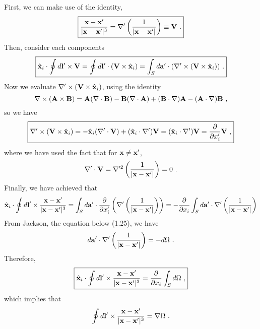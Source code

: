 \documentclass[12pt]{article}
\newcommand{\x}{{\bf x}}
\newcommand{\bl}{{\bf l}}
\begin{document}
First, we can make use of the identity,
\begin{equation}
    \boxed{
    \frac{\x - \x'}{|\x - \x'|^3} = \nabla' \left(\frac{1}{|\x - \x'|}\right) \equiv {\bf V}~.
    }
\end{equation}
Then, consider each components
\begin{align}
    \boxed{
    \hat{\x}_i \cdot \oint d\bl' \times {\bf V} = \oint d\bl' \cdot ({\bf V} \times \hat{\x}_i) = \int_S d{\bf a}' \cdot (\nabla' \times({\bf V} \times \hat{\x}_i))~.
    }
\end{align}
Now we evaluate $\nabla' \times({\bf V} \times \hat{\x}_i)$, using the identity
\begin{equation}
    \nabla \times ({\bf A} \times {\bf B}) = {\bf A}(\nabla \cdot {\bf B}) - {\bf B}(\nabla \cdot {\bf A}) + ({\bf B} \cdot \nabla) {\bf A} - ({\bf A} \cdot \nabla) {\bf B}~,
\end{equation}
so we have
\begin{equation}
    \boxed{
    \nabla' \times({\bf V} \times \hat{\x}_i) = - \hat{\x}_i(\nabla' \cdot {\bf V}) + (\hat{\x}_i \cdot \nabla') {\bf V} = (\hat{\x}_i \cdot \nabla') {\bf V} = \frac{\partial}{\partial x'_i} {\bf V}~,
    }
\end{equation}
where we have used the fact that for $\x \neq \x'$,
\begin{equation}
    \nabla' \cdot {\bf V} = \nabla'^2 \left(\frac{1}{|\x - \x'|} \right) = 0~.
\end{equation}
Finally, we have achieved that
\begin{equation}
    \hat{\x}_i \cdot \oint d\bl' \times \frac{\x - \x'}{|\x - \x'|^3} = \int_S d{\bf a}' \cdot \frac{\partial}{\partial x_i'} \left(\nabla' \left(\frac{1}{|\x - \x'|}\right)\right) = -\frac{\partial}{\partial x_i}\int_S d{\bf a}' \cdot \nabla' \left(\frac{1}{|\x - \x'|}\right)
\end{equation}
From Jackson, the equation below (1.25), we have
\begin{equation}
    d{\bf a}' \cdot \nabla' \left(\frac{1}{|\x - \x'|}\right) = - d\Omega~.
\end{equation}
Therefore,
\begin{equation}
    \boxed{
    \hat{\x}_i \cdot \oint d\bl' \times \frac{\x - \x'}{|\x - \x'|^3}  = \frac{\partial}{\partial x_i}\int_S d\Omega~,
    }
\end{equation}
which implies that
\begin{equation}
    \oint d\bl' \times \frac{\x - \x'}{|\x - \x'|^3} = \nabla \Omega~.
\end{equation}
\end{document}
